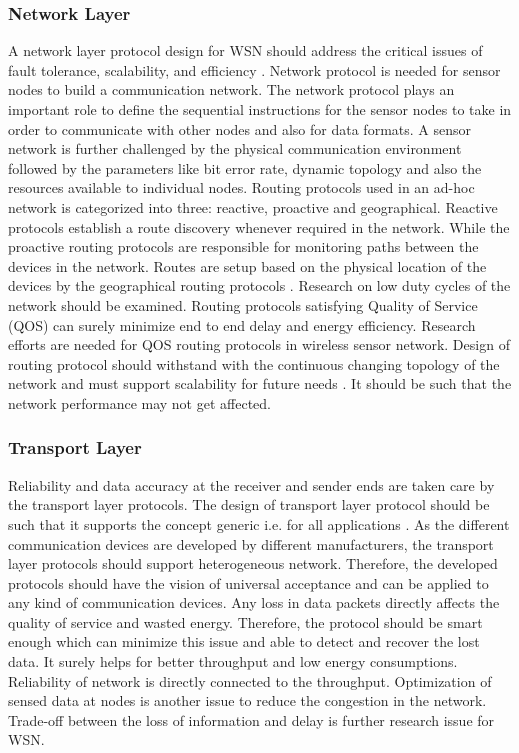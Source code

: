 \documentclass[12pt,journal,communications surveys and tutorials]{IEEEtran}
\begin{document}
\subsubsection{Network Layer}
A network layer protocol design for WSN should address the critical issues of fault tolerance, scalability, and efficiency \cite{Akyildiz2002}. Network protocol is needed for sensor nodes to build a communication network. The network protocol plays an important role to define the sequential instructions for the sensor nodes to take in order to communicate with other nodes and also for data formats.  A sensor network is further challenged by the physical communication environment followed by the parameters like bit error rate, dynamic topology and also the resources available to individual nodes. Routing protocols used in an ad-hoc network is categorized into three: reactive, proactive and geographical. Reactive protocols establish a route discovery whenever required in the network. While the proactive routing protocols are responsible for monitoring paths between the devices in the network. Routes are setup based on the physical location of the devices by the geographical routing protocols \cite{akyildiz2006wireless}.  Research on low duty cycles of the network should be examined. Routing protocols satisfying Quality of Service (QOS) can surely minimize end to end delay and energy efficiency. Research efforts are needed for QOS routing protocols in wireless sensor network. Design of routing protocol should withstand with the continuous changing topology of the network and must support scalability for future needs \cite{yick2008wireless}. It should be such that the network performance may not get  affected.

\subsubsection{Transport Layer}
Reliability and data accuracy at the receiver and sender ends are taken care by the transport layer protocols. The design of transport layer protocol should be such that it supports the concept generic i.e. for all applications \cite{yick2008wireless}. As the different communication devices are developed by different manufacturers, the transport layer protocols should support heterogeneous network. Therefore, the developed protocols should have the vision of universal acceptance and can be applied to any kind of communication devices.  Any loss in data packets directly affects the quality of service and wasted energy. Therefore, the protocol should be smart enough which can minimize this issue and able to detect and recover the lost data. It surely helps for better throughput and low energy consumptions. Reliability of network is directly connected to the throughput. Optimization of sensed data at nodes is another issue to reduce the congestion in the network.  Trade-off between the loss of information and delay is further research issue for WSN. 
\end{document}
